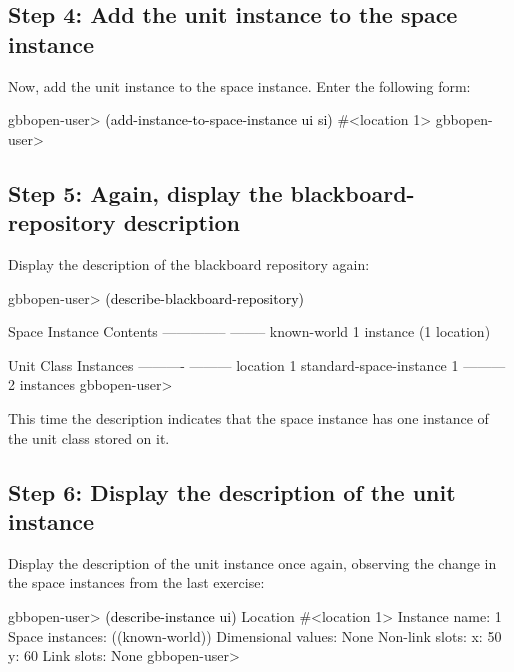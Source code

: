 \documentclass[10pt,twoside,english,pdftex]{article}
\begin{document}
\subsection*{Step 4: Add the unit instance to the space instance}

%
%
%
Now, add the  unit instance to the space instance.
Enter the following form:
%
\W\supp
\begin{example}
\textcolor{darkergray}{%
  gbbopen-user> \textcolor{black}{(add-instance-to-space-instance ui si)}
  #<location 1>
  gbbopen-user>}
\end{example}

\subsection*{Step 5: Again, display the blackboard-repository description}

%
Display the description of the blackboard repository again:
%
\W\supp
\begin{example}
\textcolor{darkergray}{%
  gbbopen-user> \textcolor{black}{(describe-blackboard-repository)}
  
  Space Instance                Contents
  --------------                --------
  known-world                   1 instance (1 location)

  Unit Class                    Instances
  ----------                    ---------
  location                              1
  standard-space-instance               1
                                ---------
                                        2 instances
  gbbopen-user>}
\end{example}

This time the description indicates that the  space instance
has one instance of the  unit class stored on it.

\subsection*{Step 6: Display the description of the unit instance}

%
Display the description of the  unit instance once again,
observing the change in the space instances from the last exercise:
%
\W\supp
\begin{example}
\textcolor{darkergray}{%
  gbbopen-user> \textcolor{black}{(describe-instance ui)}
  Location #<location 1>
    Instance name: 1
    Space instances: ((known-world))
    Dimensional values: None
    Non-link slots:
      x:  50
      y:  60
    Link slots: None
  gbbopen-user>}
\end{example}
\end{document}
